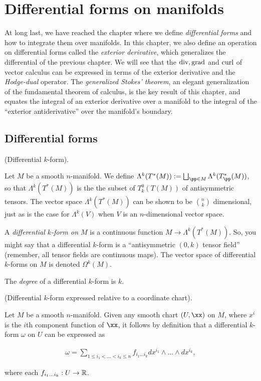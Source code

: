 \chapter{Differential forms on manifolds}
\label{ch::diff_forms}

At long last, we have reached the chapter where we define \textit{differential forms} and how to integrate them over manifolds. In this chapter, we also define an operation on differential forms called the \textit{exterior derivative}, which generalizes the differential of the previous chapter. We will see that the $\text{div}, \text{grad}$ and $\text{curl}$ of vector calculus can be expressed in terms of the exterior derivative and the \textit{Hodge-dual} operator. The \textit{generalized Stokes' theorem}, an elegant generalization of the fundamental theorem of calculus, is the key result of this chapter, and equates the integral of an exterior derivative over a manifold to the integral of the ``exterior antiderivative'' over the manifold's boundary.

\section{Differential forms}

\begin{defn}
     (Differential $k$-form).
    
    Let $M$ be a smooth $n$-manifold. We define $\Lambda^k(T^*(M)) := \bigsqcup_{\pp \in M} \Lambda^k(T_\pp^*(M))$, so that $\Lambda^k(T^*(M))$ is the the subset of $T^0_k(T(M))$ of antisymmetric tensors. The vector space $\Lambda^k(T^*(M))$ can be shown to be $\binom{n}{k}$ dimensional, just as is the case for $\Lambda^k(V)$ when $V$ is an $n$-dimensional vector space.
    
    A \textit{differential $k$-form on $M$} is a continuous function $M \rightarrow \Lambda^k(T^*(M))$. So, you might say that a differential $k$-form is a ``antisymmetric $(0, k)$ tensor field'' (remember, all tensor fields are continuous maps). The vector space of differential $k$-forms on $M$ is denoted $\Omega^k(M)$.

    The \textit{degree} of a differential $k$-form is $k$.
\end{defn}

\begin{theorem}
\label{ch::diff_forms::theorem::diff_form_in_chart}
     (Differential $k$-form expressed relative to a coordinate chart).
    
    Let $M$ be a smooth $n$-manifold. Given any smooth chart $(U, \xx)$ on $M$, where $x^i$ is the $i$th component function of $\xx$, it follows by definition that a differential $k$-form $\omega$ on $U$ can be expressed as

    \begin{align*}
        \omega = \sum_{1 \leq i_1 < ... < i_k \leq n} f_{i_1...i_k} dx^{i_1} \wedge ... \wedge dx^{i_k},
    \end{align*}
    
    where each $f_{i_1...i_k}:U \rightarrow \mathbb{R}$.
\end{theorem}

